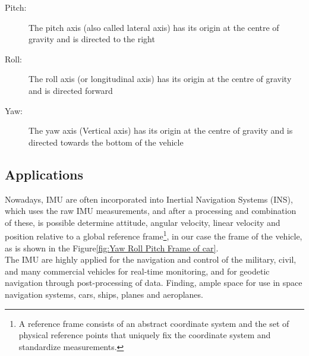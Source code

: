 \documentclass[tesi]{subfiles}
\begin{document}
\begin{description}
\item[Pitch:] The pitch axis (also called lateral axis) has its origin at the centre of gravity and is directed to the right
\item[Roll:] The roll axis (or longitudinal axis) has its origin at the centre of gravity and is directed forward
\item[Yaw:] The yaw axis (Vertical axis) has its origin at the centre of gravity and is directed towards the bottom of the vehicle
\end{description}



	
	
\subsection{Applications}\label{ssc:IMU Uses}
\noindent Nowadays, IMU are often incorporated into Inertial Navigation Systems (INS), which uses the raw IMU measurements, and after a processing and combination of these, is possible determine attitude, angular velocity, linear velocity and position relative to a global reference frame\footnote{A reference frame consists of an abstract coordinate system and the set of physical reference points that uniquely fix the coordinate system and standardize measurements.}, in our case the frame of the vehicle, as is shown in the Figure\ref{fig:Yaw Roll Pitch Frame of car}.\\ 
The IMU are highly applied for the navigation and control of the military, civil, and many commercial vehicles for real-time monitoring, and for geodetic navigation through post-processing of data.
Finding, ample space for use in space navigation systems, cars, ships, planes and aeroplanes.\\
\end{document}

